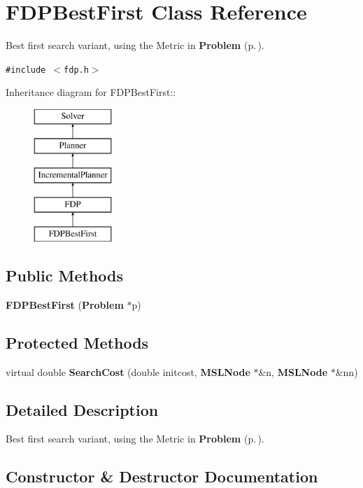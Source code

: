 \section{FDPBest\-First  Class Reference}
\label{class_FDPBestFirst}
Best first search variant, using the Metric in {\bf Problem} {\rm (p.\,\pageref{class_Problem})}. 


{\tt \#include $<$fdp.h$>$}

Inheritance diagram for FDPBest\-First::\begin{figure}[H]
\begin{center}
\leavevmode
\includegraphics[height=5cm]{class_FDPBestFirst}
\end{center}
\end{figure}
\subsection*{Public Methods}
\begin{CompactItemize}
\item 
{\bf FDPBest\-First} ({\bf Problem} $\ast$p)
\end{CompactItemize}
\subsection*{Protected Methods}
\begin{CompactItemize}
\item 
virtual double {\bf Search\-Cost} (double initcost, {\bf MSLNode} $\ast$\&n, {\bf MSLNode} $\ast$\&nn)
\end{CompactItemize}


\subsection{Detailed Description}
Best first search variant, using the Metric in {\bf Problem} {\rm (p.\,\pageref{class_Problem})}.



\subsection{Constructor \& Destructor Documentation}
